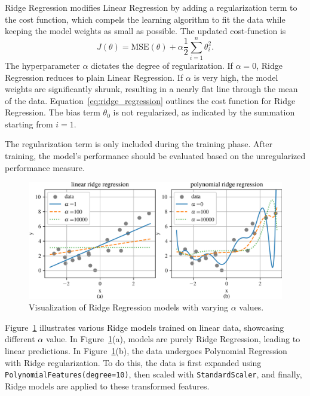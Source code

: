 \documentclass[12pt,letter]{article}
\begin{document}



Ridge Regression modifies Linear Regression by adding a regularization term to the cost function, which compels the learning algorithm to fit the data while keeping the model weights as small as possible. The updated cost-function is
\begin{equation}
J(\theta) = \text{MSE}(\theta) + \alpha \frac{1}{2} \sum_{i=1}^{n} \theta_i^2.
\label{eq:ridge_regression}
\end{equation}
The hyperparameter $\alpha$ dictates the degree of regularization. If $\alpha = 0$, Ridge Regression reduces to plain Linear Regression. If $\alpha$ is very high, the model weights are significantly shrunk, resulting in a nearly flat line through the mean of the data. Equation~\ref{eq:ridge_regression} outlines the cost function for Ridge Regression. The bias term $\theta_0$ is not regularized, as indicated by the summation starting from $i = 1$.

\begin{mdframed}[middlelinewidth=0.5mm]
\begin{center}
\end{center}
The regularization term is only included during the training phase. After training, the model's performance should be evaluated based on the unregularized performance measure.
\end{mdframed}

\begin{figure}[H]
    \centering
    \includegraphics[width=6.5in]{../figures/ridge_regression.png}
    \caption{Visualization of Ridge Regression models with varying $\alpha$ values.}
    \label{fig:ridge_regression}
\end{figure}

Figure~\ref{fig:ridge_regression} illustrates various Ridge models trained on linear data, showcasing different $\alpha$ value. In Figure~\ref{fig:ridge_regression}(a), models are purely Ridge Regression, leading to linear predictions. In Figure~\ref{fig:ridge_regression}(b), the data undergoes Polynomial Regression with Ridge regularization. To do this, the data is first expanded using \texttt{PolynomialFeatures(degree=10)}, then scaled with \texttt{StandardScaler}, and finally, Ridge models are applied to these transformed features.
\end{document}
